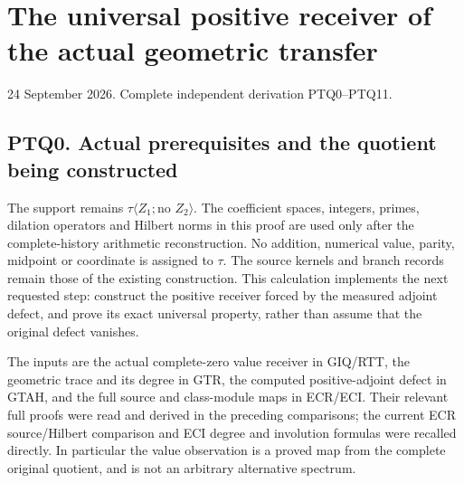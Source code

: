 \section{The universal positive receiver of the actual geometric
transfer}\label{the-universal-positive-receiver-of-the-actual-geometric-transfer}

24 September 2026. Complete independent derivation PTQ0--PTQ11.

\subsection{PTQ0. Actual prerequisites and the quotient being
constructed}\label{ptq0.-actual-prerequisites-and-the-quotient-being-constructed}

The support remains \(\tau\langle Z_1;\text{no }Z_2\rangle\). The
coefficient spaces, integers, primes, dilation operators and Hilbert
norms in this proof are used only after the complete-history arithmetic
reconstruction. No addition, numerical value, parity, midpoint or
coordinate is assigned to \(\tau\). The source kernels and branch
records remain those of the existing construction. This calculation
implements the next requested step: construct the positive receiver
forced by the measured adjoint defect, and prove its exact universal
property, rather than assume that the original defect vanishes.

The inputs are the actual complete-zero value receiver in GIQ/RTT, the
geometric trace and its degree in GTR, the computed positive-adjoint
defect in GTAH, and the full source and class-module maps in ECR/ECI.
Their relevant full proofs were read and derived in the preceding
comparisons; the current ECR source/Hilbert comparison and ECI degree
and involution formulas were recalled directly. In particular the value
observation is a proved map from the complete original quotient, and is
not an arbitrary alternative spectrum.

